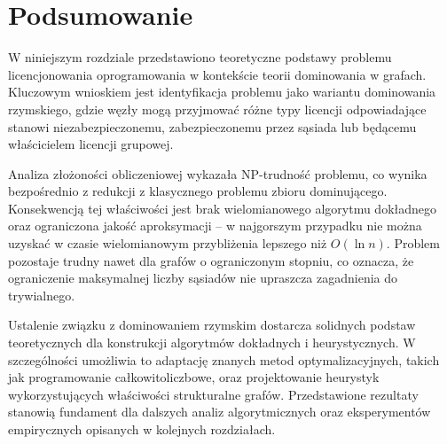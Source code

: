 \section{Podsumowanie}

W niniejszym rozdziale przedstawiono teoretyczne podstawy problemu licencjonowania oprogramowania w kontekście teorii dominowania w grafach. Kluczowym wnioskiem jest identyfikacja problemu jako wariantu dominowania rzymskiego, gdzie węzły mogą przyjmować różne typy licencji odpowiadające stanowi niezabezpieczonemu, zabezpieczonemu przez sąsiada lub będącemu właścicielem licencji grupowej.

Analiza złożoności obliczeniowej wykazała NP-trudność problemu, co wynika bezpośrednio z redukcji z klasycznego problemu zbioru dominującego. Konsekwencją tej właściwości jest brak wielomianowego algorytmu dokładnego oraz ograniczona jakość aproksymacji -- w najgorszym przypadku nie można uzyskać w czasie wielomianowym przybliżenia lepszego niż $O(\ln n)$. Problem pozostaje trudny nawet dla grafów o ograniczonym stopniu, co oznacza, że ograniczenie maksymalnej liczby sąsiadów nie upraszcza zagadnienia do trywialnego.

Ustalenie związku z dominowaniem rzymskim dostarcza solidnych podstaw teoretycznych dla konstrukcji algorytmów dokładnych i heurystycznych. W szczególności umożliwia to adaptację znanych metod optymalizacyjnych, takich jak programowanie całkowitoliczbowe, oraz projektowanie heurystyk wykorzystujących właściwości strukturalne grafów. Przedstawione rezultaty stanowią fundament dla dalszych analiz algorytmicznych oraz eksperymentów empirycznych opisanych w kolejnych rozdziałach.
